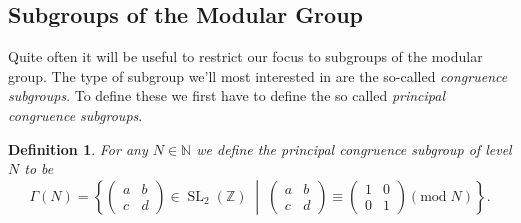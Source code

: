\documentclass[a4paper]{article}
\theoremstyle{theoremdd}
\theoremstyle{definitiondd}
\newtheorem{definition}[theorem]{Definition}
\theoremstyle{remarkdd}
\newcommand{\N}{\mathbb{N}}
\newcommand{\Z}{\mathbb{Z}}
\newcommand{\bigset}[2]{ \left\{ #1 \;\middle|\; #2 \right\} }
\DeclareMathOperator{\SL}{SL}
\begin{document}
\subsection{Subgroups of the Modular Group} \label{sec:subgroups_of_the_modular_group}
Quite often it will be useful to restrict our focus to subgroups of the modular group. 
The type of subgroup we'll most interested in are the so-called \emph{congruence subgroups}.
To define these we first have to define the so called \emph{principal congruence subgroups}.  
\begin{definition}
	For any $N \in \N$ we define the \emph{principal congruence subgroup of level $N$} to be \[
		\Gamma(N) = \bigset{\begin{pmatrix} a & b \\ c & d \end{pmatrix} \in \SL_2(\Z)}{\begin{pmatrix} a & b \\ c & d \end{pmatrix}  \equiv \begin{pmatrix} 1 & 0 \\ 0 & 1 \end{pmatrix}  (\mathrm{mod}\; N)}
	.\] 
\end{definition}
\end{document}
